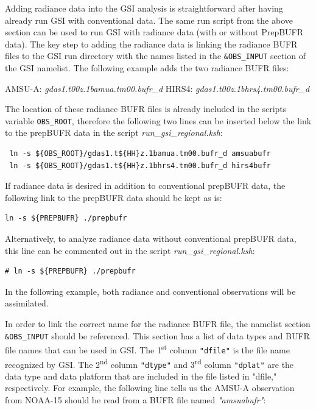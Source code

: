 Adding radiance data into the GSI analysis is straightforward after having already run GSI with conventional data.  The same run script from the above section can be used to run GSI with radiance data (with or without PrepBUFR data).  The key step to adding the radiance data is linking the radiance BUFR files to the GSI run directory with the names listed in the \verb|&OBS_INPUT| section of the GSI namelist. The following example adds the two radiance BUFR files:

AMSU-A:   \textit{gdas1.t00z.1bamua.tm00.bufr\_d}\newline
HIRS4:    \textit{gdas1.t00z.1bhrs4.tm00.bufr\_d}

The location of these radiance BUFR files is already included in the scripts variable \verb|OBS_ROOT|, therefore the following two lines can be inserted below the link to the prepBUFR data in the script \textit{run\_gsi\_regional.ksh}:

\begin{scriptsize}
\begin{verbatim}
 ln -s ${OBS_ROOT}/gdas1.t${HH}z.1bamua.tm00.bufr_d amsuabufr
 ln -s ${OBS_ROOT}/gdas1.t${HH}z.1bhrs4.tm00.bufr_d hirs4bufr
\end{verbatim}
\end{scriptsize}

If radiance data is desired in addition to conventional prepBUFR data, the following link to the prepBUFR data should be kept as is:

\begin{scriptsize}
\begin{verbatim}
ln -s ${PREPBUFR} ./prepbufr
\end{verbatim}
\end{scriptsize}

Alternatively, to analyze radiance data without conventional prepBUFR data, this line can be commented out in the script \textit{run\_gsi\_regional.ksh}:

\begin{scriptsize}
\begin{verbatim}
# ln -s ${PREPBUFR} ./prepbufr
\end{verbatim}
\end{scriptsize}

In the following example, both radiance and conventional observations will be assimilated.  

In order to link the correct name for the radiance BUFR file, the namelist section \verb|&OBS_INPUT| should be referenced.  This section has a list of data types and BUFR file names that can be used in GSI.  The 1\textsuperscript{st} column \verb|"dfile"| is the file name recognized by GSI.  The 2\textsuperscript{nd} column \verb|"dtype"| and 3\textsuperscript{rd} column \verb|"dplat"| are the data type and data platform that are included in the file listed in "dfile," respectively. For example, the following line tells us the AMSU-A observation from NOAA-15 should be read from a BUFR file named \textit{"amsuabufr"}:

